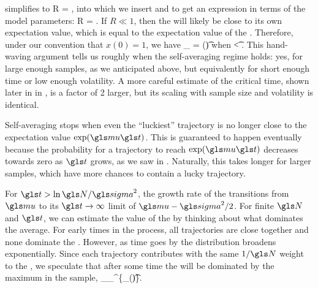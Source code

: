  simplifies to
\be
R = ,
\ee
into which we insert  and  to get an expression in terms of the \GBM model parameters:
\be
R = .
\ee
If $R \ll 1$, then the \FEA will likely be close to its own expectation value, which is equal to the expectation value of the \GBM. Therefore, under our convention that $x(0)=1$, we have
\be
\ave{\x(\t)}_\N\approx\ave{\x(\t)} = \exp(\gmu\t)
\ee
when
\be
\t < .
\ee
This hand-waving argument tells us roughly when the self-averaging regime holds: yes, for large enough samples, as we anticipated above, but equivalently for short enough time or low enough volatility. A more careful estimate of the critical time, shown later in in , is a factor of 2 larger, but its scaling with sample size and volatility is identical.

Self-averaging stops when even the ``luckiest'' trajectory is no longer close to the expectation value $\exp(\gmu \t)$. This is guaranteed to happen eventually because the probability for a trajectory to reach $\exp(\gmu \t)$ decreases towards zero as $\t$ grows, as we saw in . Naturally, this takes longer for larger samples, which have more chances to contain a lucky trajectory.

For $\t>\ln \N/\gsigma^2$, the growth rate of the \FEA transitions from $\gmu$ to its $\t\to\infty$ limit of $\gmu-\gsigma^2/2$. For finite $\N$ and $\t$, we can estimate the value of the \FEA by thinking about what dominates the average. For early times in the process, all trajectories are close together and none dominate the \FEA. However, as time goes by the distribution broadens exponentially. Since each trajectory contributes with the same $1/\N$ weight to the \FEA, we speculate that after some time the \FEA will be dominated by the maximum in the sample, \ie
\be
\ave{\x(\t)}_\N \approx {}\max_{}^\N \{\x_\gi(\t)\}.
\ee

